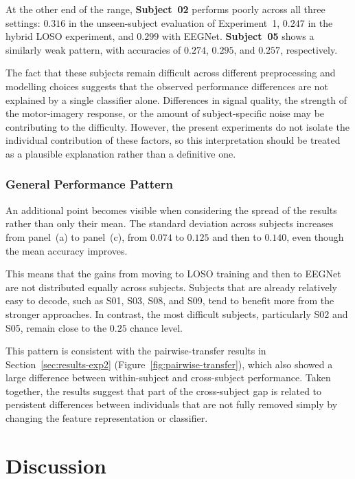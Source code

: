 \documentclass[11pt,a4paper]{article}
\begin{document}
At the other end of the range, \textbf{Subject~02} performs poorly across all three settings:
$0.316$ in the unseen-subject evaluation of Experiment~1, $0.247$ in the hybrid LOSO experiment,
and $0.299$ with EEGNet. \textbf{Subject~05} shows a similarly weak pattern, with accuracies of
$0.274$, $0.295$, and $0.257$, respectively.

The fact that these subjects remain difficult across different preprocessing and modelling
choices suggests that the observed performance differences are not explained by a single
classifier alone. Differences in signal quality, the strength of the motor-imagery response,
or the amount of subject-specific noise may be contributing to the difficulty. However, the
present experiments do not isolate the individual contribution of these factors, so this
interpretation should be treated as a plausible explanation rather than a definitive one.

\subsubsection{General Performance Pattern}

An additional point becomes visible when considering the spread of the results rather than only
their mean. The standard deviation across subjects increases from panel~(a) to panel~(c),
from $0.074$ to $0.125$ and then to $0.140$, even though the mean accuracy improves.

This means that the gains from moving to LOSO training and then to EEGNet are not distributed
equally across subjects. Subjects that are already relatively easy to decode, such as S01, S03,
S08, and S09, tend to benefit more from the stronger approaches. In contrast, the most difficult
subjects, particularly S02 and S05, remain close to the $0.25$ chance level.

This pattern is consistent with the pairwise-transfer results in Section~\ref{sec:results-exp2}
(Figure~\ref{fig:pairwise-transfer}), which also showed a large difference between within-subject
and cross-subject performance. Taken together, the results suggest that part of the cross-subject
gap is related to persistent differences between individuals that are not fully removed simply
by changing the feature representation or classifier.

\section{Discussion}
\label{sec:discussion}
\end{document}
